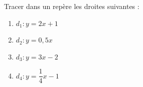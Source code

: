 \begin{exo}{}
	Tracer dans un repère les droites suivantes :
	\begin{enumerate}
		\item $d_1 : y = 2x + 1$
		\item $d_2 : y = 0,5x$
		\item $d_3 : y = 3x - 2$
		\item $d_4 : y = \dfrac{1}{4}x - 1$
	\end{enumerate}
\end{exo}

